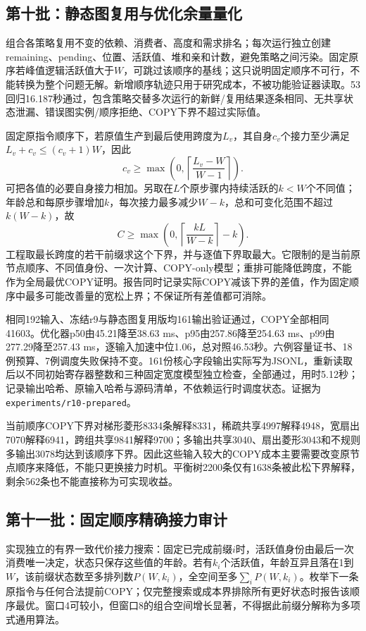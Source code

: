 \documentclass[UTF8,11pt,fontset=fandol]{ctexart}
\begin{document}
\subsection{第十批：静态图复用与优化余量量化}
组合各策略复用不变的依赖、消费者、高度和需求排名；每次运行独立创建remaining、pending、位置、活跃值、堆和亲和计数，避免策略之间污染。固定原序若峰值逻辑活跃值大于$W$，可跳过该顺序的基线；这只说明固定顺序不可行，不能转换为整个问题无解。新增顺序轨迹只用于研究成本，不被功能验证器读取。53回归16.187秒通过，包含策略交替多次运行的新鲜/复用结果逐条相同、无共享状态泄漏、错误图实例/顺序拒绝、COPY下界不超过实际值。

固定原指令顺序下，若原值生产到最后使用跨度为$L_v$，其自身$c_v$个接力至少满足$L_v+c_v\le(c_v+1)W$，因此
\[c_v\ge\max\left(0,\left\lceil\frac{L_v-W}{W-1}\right\rceil\right).\]
可把各值的必要自身接力相加。另取在$L$个原步骤内持续活跃的$k<W$个不同值；年龄总和每原步骤增加$k$，每次接力最多减少$W-k$，总和可变化范围不超过$k(W-k)$，故
\[C\ge\max\left(0,\left\lceil\frac{kL}{W-k}\right\rceil-k\right).\]
工程取最长跨度的若干前缀求这个下界，并与逐值下界取最大。它限制的是当前原节点顺序、不同值身份、一次计算、COPY-only模型；重排可能降低跨度，不能作为全局最优COPY证明。报告同时记录实际COPY减该下界的差值，作为固定顺序中最多可能改善量的宽松上界；不保证所有差值都可消除。

相同192输入、冻结r9与静态图复用版均161输出验证通过，COPY全部相同41603。优化器p50由45.21降至38.63 ms、p95由257.86降至254.63 ms、p99由277.29降至257.43 ms，逐输入加速中位1.06，总对照46.53秒。六例容量证书、18例预算、7例调度失败保持不变。161份核心字段输出实际写为JSONL，重新读取后以不同初始寄存器整数和三种固定宽度模型独立检查，全部通过，用时5.12秒；记录输出哈希、原输入哈希与源码清单，不依赖运行时调度状态。证据为\texttt{experiments/r10-prepared}。

当前顺序COPY下界对梯形菱形8334条解释8331，稀疏共享4997解释4948，宽扇出7070解释6941，跨组共享9841解释9700；多输出共享3040、扇出菱形3043和不规则多输出3078均达到该顺序下界。因此这些输入较大的COPY成本主要需要改变原节点顺序来降低，不能只更换接力时机。平衡树2200条仅有1638条被此松下界解释，剩余562条也不能直接称为可实现收益。

\subsection{第十一批：固定顺序精确接力审计}
实现独立的有界一致代价接力搜索：固定已完成前缀$i$时，活跃值身份由最后一次消费唯一决定，状态只保存这些值的年龄。若有$k_i$个活跃值，年龄互异且落在1到$W$，该前缀状态数至多排列数$P(W,k_i)$，全空间至多$\sum_i P(W,k_i)$。枚举下一条原指令与任何合法提前COPY；仅完整搜索或成本界排除所有更好状态时报告该顺序最优。窗口4可较小，但窗口8的组合空间增长显著，不得据此前缀分解称为多项式通用算法。
\end{document}
